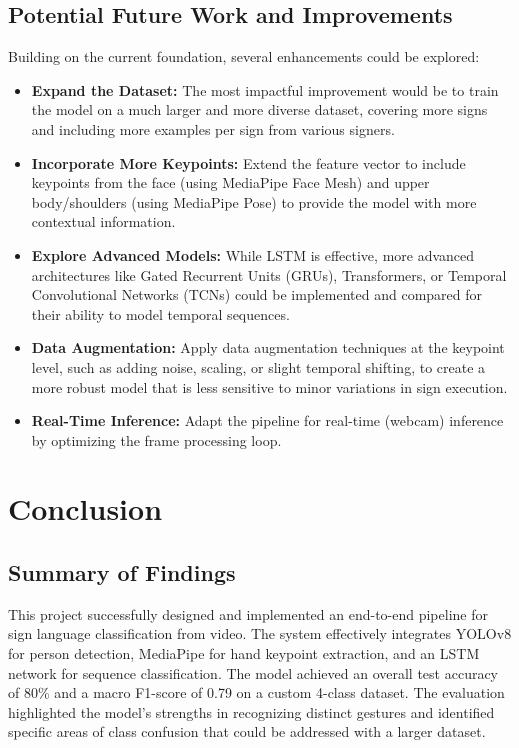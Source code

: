 \documentclass[11pt, a4paper]{article}
\begin{document}
\subsection{Potential Future Work and Improvements}
Building on the current foundation, several enhancements could be explored:
\begin{itemize}
    \item \textbf{Expand the Dataset:} The most impactful improvement would be to train the model on a much larger and more diverse dataset, covering more signs and including more examples per sign from various signers.
    \item \textbf{Incorporate More Keypoints:} Extend the feature vector to include keypoints from the face (using MediaPipe Face Mesh) and upper body/shoulders (using MediaPipe Pose) to provide the model with more contextual information.
    \item \textbf{Explore Advanced Models:} While LSTM is effective, more advanced architectures like Gated Recurrent Units (GRUs), Transformers, or Temporal Convolutional Networks (TCNs) could be implemented and compared for their ability to model temporal sequences.
    \item \textbf{Data Augmentation:} Apply data augmentation techniques at the keypoint level, such as adding noise, scaling, or slight temporal shifting, to create a more robust model that is less sensitive to minor variations in sign execution.
    \item \textbf{Real-Time Inference:} Adapt the pipeline for real-time (webcam) inference by optimizing the frame processing loop.
\end{itemize}


\section{Conclusion}

\subsection{Summary of Findings}
This project successfully designed and implemented an end-to-end pipeline for sign language classification from video. The system effectively integrates YOLOv8 for person detection, MediaPipe for hand keypoint extraction, and an LSTM network for sequence classification. The model achieved an overall test accuracy of 80\% and a macro F1-score of 0.79 on a custom 4-class dataset. The evaluation highlighted the model's strengths in recognizing distinct gestures and identified specific areas of class confusion that could be addressed with a larger dataset.
\end{document}
